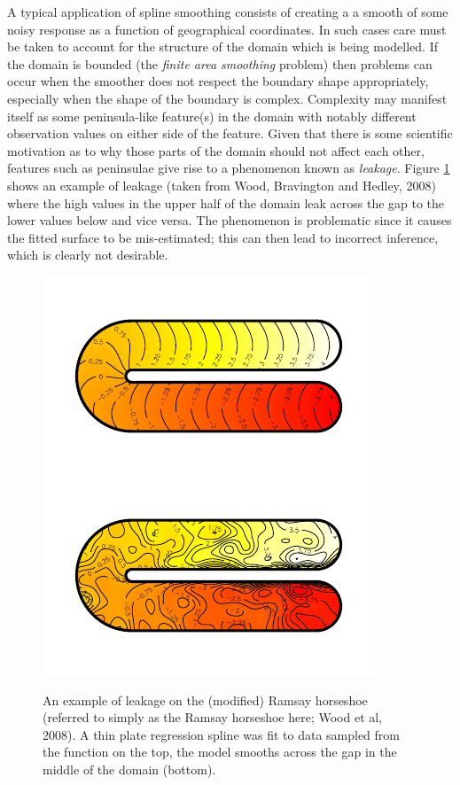 \documentclass[useAMS, referee]{biom}
\begin{document}
A typical application of spline smoothing consists of creating a a smooth of some noisy response as a function of geographical coordinates. In such cases care must be taken to account for the structure of the domain which is being modelled. If the domain is bounded (the \textit{finite area smoothing} problem) then problems can occur when the smoother does not respect the boundary shape appropriately, especially when the shape of the boundary is complex. Complexity may manifest itself as some peninsula-like feature(s) in the domain with notably different observation values on either side of the feature. Given that there is some scientific motivation as to why those parts of the domain should not affect each other, features such as peninsulae give rise to a phenomenon known as \emph{leakage}. Figure \ref{leakage} shows an example of leakage (taken from Wood, Bravington and Hedley, 2008) where the high values in the upper half of the domain leak across the gap to the lower values below and vice versa. The phenomenon is problematic since it causes the fitted surface to be mis-estimated; this can then lead to incorrect inference, which is clearly not desirable. 

\begin{figure}
\centering
\includegraphics{figs/ramsay-leak.pdf}\\
\caption{An example of leakage on the (modified) Ramsay horseshoe (referred to simply as the Ramsay horseshoe here; Wood et al, 2008). A thin plate regression spline was fit to data sampled from the function on the top, the model smooths across the gap in the middle of the domain (bottom).}
\label{leakage}
\end{figure}
\end{document}
